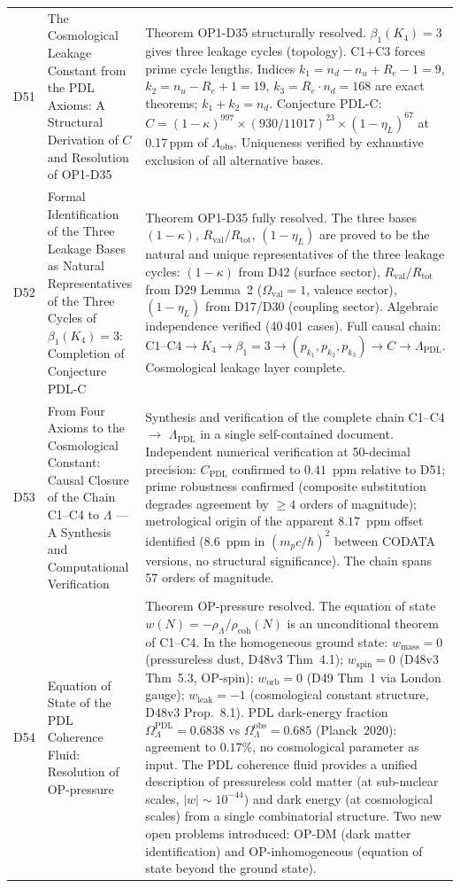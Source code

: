 \documentclass[11pt,a4paper]{article}
\newcommand{\Rval}{R_{\mathrm{val}}}
\theoremstyle{plain}
\theoremstyle{definition}
\theoremstyle{remark}
\newcommand{\Rtot}{R_{\mathrm{tot}}}
\newcommand{\rhocoh}{\rho_{\mathrm{coh}}}
\begin{document}
\begin{longtable}{L{1.3cm}L{3.8cm}L{8.0cm}}
D51 & The Cosmological Leakage Constant from the PDL Axioms: A Structural Derivation of $C$ and Resolution of OP1-D35~\cite{D51} & \textcolor{proofblue}{Theorem} OP1-D35 structurally resolved. $\beta_1(K_4)=3$ gives three leakage cycles (topology). C1+C3 forces prime cycle lengths. Indices $k_1 = n_d - n_u + R_e - 1 = 9$, $k_2 = n_u - R_e + 1 = 19$, $k_3 = R_e \cdot n_d = 168$ are exact theorems; $k_1+k_2=n_d$. Conjecture PDL-C: $C = (1-\kappa)^{997} \times (930/11017)^{23} \times (1-\eta_L)^{67}$ at 0.17\,ppm of $\Lambda_{\mathrm{obs}}$. Uniqueness verified by exhaustive exclusion of all alternative bases.\\[0.4em]
D52 & Formal Identification of the Three Leakage Bases as Natural Representatives of the Three Cycles of $\beta_1(K_4)=3$: Completion of Conjecture PDL-C~\cite{D52} & \textcolor{proofblue}{Theorem} OP1-D35 fully resolved. The three bases $(1-\kappa)$, $\Rval/\Rtot$, $(1-\eta_L)$ are proved to be the natural and unique representatives of the three leakage cycles: $(1-\kappa)$ from D42 (surface sector), $\Rval/\Rtot$ from D29 Lemma~2 ($\Omega_{\mathrm{val}}=1$, valence sector), $(1-\eta_L)$ from D17/D30 (coupling sector). Algebraic independence verified (40\,401 cases). Full causal chain: $\mathrm{C1}\text{--}\mathrm{C4} \to K_4 \to \beta_1=3 \to (p_{k_1},p_{k_2},p_{k_3}) \to C \to \Lambda_{\mathrm{PDL}}$. Cosmological leakage layer complete.\\[0.4em]
D53 & From Four Axioms to the Cosmological Constant: Causal Closure of the Chain C1--C4 to $\Lambda$ --- A Synthesis and Computational Verification~\cite{D53} & \textcolor{proofblue}{Synthesis and verification} of the complete chain C1--C4 $\to$ $\Lambda_{\mathrm{PDL}}$ in a single self-contained document. Independent numerical verification at 50-decimal precision: $C_{\mathrm{PDL}}$ confirmed to $0.41$~ppm relative to D51; prime robustness confirmed (composite substitution degrades agreement by $\geq 4$ orders of magnitude); metrological origin of the apparent $8.17$~ppm offset identified ($8.6$~ppm in $(m_p c/\hbar)^2$ between CODATA versions, no structural significance). The chain spans 57 orders of magnitude.\\[0.4em]
D54 & Equation of State of the PDL Coherence Fluid: Resolution of OP-pressure~\cite{D54} & \textcolor{proofblue}{Theorem} OP-pressure resolved. The equation of state $w(N) = -\rho_\Lambda/\rhocoh(N)$ is an unconditional theorem of C1--C4. In the homogeneous ground state: $w_{\mathrm{mass}} = 0$ (pressureless dust, D48v3 Thm~4.1); $w_{\mathrm{spin}} = 0$ (D48v3 Thm~5.3, OP-spin); $w_{\mathrm{orb}} = 0$ (D49 Thm~1 via London gauge); $w_{\mathrm{leak}} = -1$ (cosmological constant structure, D48v3 Prop.~8.1). PDL dark-energy fraction $\Omega_\Lambda^{\mathrm{PDL}} = 0.6838$ vs $\Omega_\Lambda^{\mathrm{obs}} = 0.685$ (Planck~2020): agreement to $0.17\%$, no cosmological parameter as input. The PDL coherence fluid provides a unified description of pressureless cold matter (at sub-nuclear scales, $|w|\sim 10^{-44}$) and dark energy (at cosmological scales) from a single combinatorial structure. Two new open problems introduced: OP-DM (dark matter identification) and OP-inhomogeneous (equation of state beyond the ground state).\\[0.4em]

\end{longtable}
\end{document}
